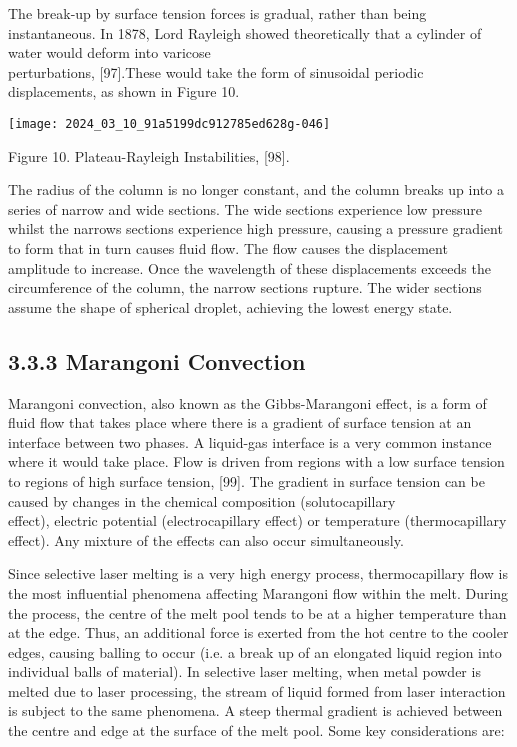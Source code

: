 \documentclass[10pt]{article}
\begin{document}
The break-up by surface tension forces is gradual, rather than being instantaneous. In 1878, Lord Rayleigh showed theoretically that a cylinder of water would deform into varicose\\
perturbations, [97].These would take the form of sinusoidal periodic displacements, as shown in Figure 10.

\begin{center}
\texttt{[image: 2024\_03\_10\_91a5199dc912785ed628g-046]}
\end{center}

Figure 10. Plateau-Rayleigh Instabilities, [98].

The radius of the column is no longer constant, and the column breaks up into a series of narrow and wide sections. The wide sections experience low pressure whilst the narrows sections experience high pressure, causing a pressure gradient to form that in turn causes fluid flow. The flow causes the displacement amplitude to increase. Once the wavelength of these displacements exceeds the circumference of the column, the narrow sections rupture. The wider sections assume the shape of spherical droplet, achieving the lowest energy state.

\subsection*{3.3.3 Marangoni Convection}
Marangoni convection, also known as the Gibbs-Marangoni effect, is a form of fluid flow that takes place where there is a gradient of surface tension at an interface between two phases. A liquid-gas interface is a very common instance where it would take place. Flow is driven from regions with a low surface tension to regions of high surface tension, [99]. The gradient in surface tension can be caused by changes in the chemical composition (solutocapillary\\
effect), electric potential (electrocapillary effect) or temperature (thermocapillary effect). Any mixture of the effects can also occur simultaneously.

Since selective laser melting is a very high energy process, thermocapillary flow is the most influential phenomena affecting Marangoni flow within the melt. During the process, the centre of the melt pool tends to be at a higher temperature than at the edge. Thus, an additional force is exerted from the hot centre to the cooler edges, causing balling to occur (i.e. a break up of an elongated liquid region into individual balls of material). In selective laser melting, when metal powder is melted due to laser processing, the stream of liquid formed from laser interaction is subject to the same phenomena. A steep thermal gradient is achieved between the centre and edge at the surface of the melt pool. Some key considerations are:
\end{document}
